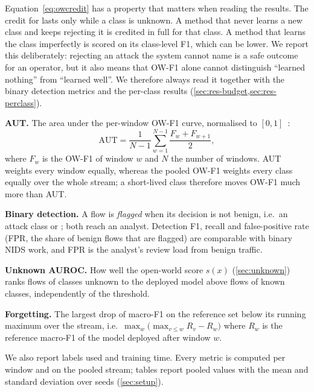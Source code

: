 Equation~\eqref{eq:owcredit} has a property that matters when reading the results. The credit for \unk{} lasts
only while a class is unknown. A method that never learns a new class and keeps rejecting it is credited in full
for that class. A method that learns the class imperfectly is scored on its class-level F1, which can be lower. We
report this deliberately: rejecting an attack the system cannot name is a safe outcome for an operator, but it
also means that OW-F1 alone cannot distinguish ``learned nothing'' from ``learned well''. We therefore always
read it together with the binary detection metrics and the per-class results (\cref{sec:res-budget,sec:res-perclass}).

\textbf{AUT.} The area under the per-window OW-F1 curve, normalised to $[0,1]$~\cite{pendlebury2019tesseract}:
\begin{equation}
\mathrm{AUT} = \frac{1}{N-1} \sum_{w=1}^{N-1} \frac{F_w + F_{w+1}}{2},
\end{equation}
where $F_w$ is the OW-F1 of window $w$ and $N$ the number of windows. AUT weights every window equally, whereas
the pooled OW-F1 weights every class equally over the whole stream; a short-lived class therefore moves OW-F1 much
more than AUT.

\textbf{Binary detection.} A flow is \emph{flagged} when its decision is not benign, i.e.\ an attack class or
\unk{}; both reach an analyst. Detection F1, recall and false-positive rate (FPR, the share of benign flows that
are flagged) are comparable with binary NIDS work, and FPR is the analyst's review load from benign traffic.

\textbf{Unknown AUROC.} How well the open-world score $s(x)$ (\cref{sec:unknown}) ranks flows of classes unknown
to the deployed model above flows of known classes, independently of the threshold.

\textbf{Forgetting.} The largest drop of macro-F1 on the reference set below its running maximum over the
stream, i.e.\ $\max_w \bigl(\max_{v \le w} R_v - R_w\bigr)$ where $R_w$ is the reference macro-F1 of the model
deployed after window $w$.

We also report labels used and training time. Every metric is computed per window and on the pooled stream; tables
report pooled values with the mean and standard deviation over seeds (\cref{sec:setup}).
